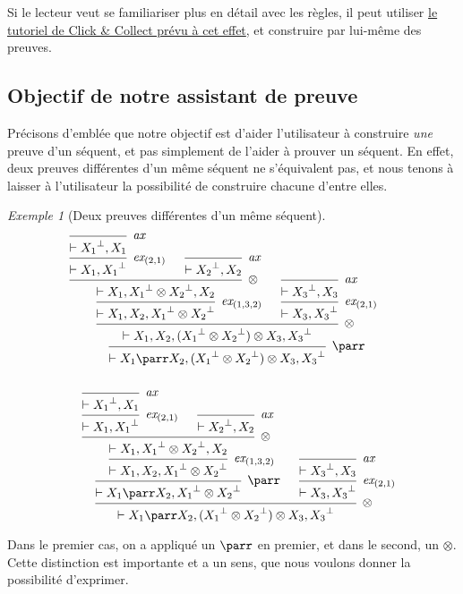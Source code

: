 \documentclass[11pt,a4paper]{article}
\theoremstyle{plain}
\theoremstyle{definition}
\theoremstyle{remark}
\newtheorem{example}{Exemple}
\newcommand*{\orth}{^\perp}
\newcommand*{\tensor}{\otimes}
\newcommand*{\axv}[1]{\infer{0}[\ensuremath{\mathit{ax}}]{\vdash #1}}
\newcommand*{\tensorv}[1]{\infer{2}[\ensuremath{\tensor}]{\vdash #1}}
\newcommand*{\parrv}[1]{\infer{1}[\ensuremath{\parr}]{\vdash #1}}
\newcommand*{\permv}[2]{\infer{1}[\ensuremath{\textit{ex}_{#1}}]{\vdash #2}}
\begin{document}
Si le lecteur veut se familiariser plus en détail avec les règles, il peut utiliser \href{https://click-and-collect.linear-logic.org/#tutorial}{le tutoriel de Click \& Collect prévu à cet effet}, et construire par lui-même des preuves.

\subsection{Objectif de notre assistant de preuve}
Précisons d'emblée que notre objectif est d'aider l'utilisateur à construire \textit{une} preuve d'un séquent, et pas simplement de l'aider à prouver un séquent. En effet, deux preuves différentes d'un même séquent ne s'équivalent pas, et nous tenons à laisser à l'utilisateur la possibilité de construire chacune d'entre elles.

\begin{example}[Deux preuves différentes d'un même séquent]
    \begin{align*}
    \begin{multlined}
        \begin{prooftree}
                 \axv{{X_1}\orth, X_1}
                 \permv{(2, 1)}{X_1, {X_1}\orth}
                 \axv{{X_2}\orth, X_2}
              \tensorv{X_1, {X_1}\orth \tensor {X_2}\orth, X_2}
              \permv{(1, 3, 2)}{X_1, X_2, {X_1}\orth \tensor {X_2}\orth}
              \axv{{X_3}\orth, X_3}
              \permv{(2, 1)}{X_3, {X_3}\orth}
           \tensorv{X_1, X_2, ({X_1}\orth \tensor {X_2}\orth) \tensor X_3, {X_3}\orth}
        \parrv{X_1 \parr X_2, ({X_1}\orth \tensor {X_2}\orth) \tensor X_3, {X_3}\orth}
        \end{prooftree} \\ \\
        \begin{prooftree}
                 \axv{{X_1}\orth, X_1}
                 \permv{(2, 1)}{X_1, {X_1}\orth}
                 \axv{{X_2}\orth, X_2}
              \tensorv{X_1, {X_1}\orth \tensor {X_2}\orth, X_2}
              \permv{(1, 3, 2)}{X_1, X_2, {X_1}\orth \tensor {X_2}\orth}
           \parrv{X_1 \parr X_2, {X_1}\orth \tensor {X_2}\orth}
           \axv{{X_3}\orth, X_3}
           \permv{(2, 1)}{X_3, {X_3}\orth}
        \tensorv{X_1 \parr X_2, ({X_1}\orth \tensor {X_2}\orth) \tensor X_3, {X_3}\orth}
        \end{prooftree}
    \end{multlined}
    \end{align*}
    
    Dans le premier cas, on a appliqué un $\parr$ en premier, et dans le second, un $\tensor$. Cette distinction est importante et a un sens, que nous voulons donner la possibilité d'exprimer.
\end{example}
\end{document}
